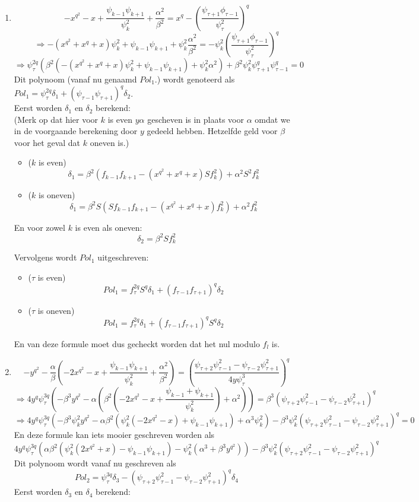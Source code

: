 \documentclass[10pt]{article}
\begin{document}
\begin{enumerate}
\item $$-x^{q^2}-x+\frac{\psi_{k-1}\psi_{k+1}}{\psi_k^2}+\frac{\alpha^2}{\beta^2}=x^q-(\frac{\psi_{\tau+1}\phi_{\tau-1}}{\psi_\tau^2})^q$$
$$ \Rightarrow -(x^{q^2}+x^q+x)\psi_k^2+\psi_{k-1}\psi_{k+1}+\psi_k^2\frac{\alpha^2}{\beta^2}=-\psi_k^2(\frac{\psi_{\tau+1}\phi_{\tau-1}}{\psi_\tau^2})^q$$
$$ \Rightarrow \psi_\tau^{2q}(\beta^2(-(x^{q^2}+x^q+x)\psi_k^2+\psi_{k-1}\psi_{k+1})+\psi_k^2\alpha^2)+\beta^2\psi_k^2\psi_{\tau+1}^q\psi_{\tau-1}^q=0  $$
Dit polynoom (vanaf nu genaamd $Pol_1$.) wordt genoteerd als $Pol_1=\psi_\tau^{2q}\delta_1+(\psi_{\tau-1}\psi_{\tau+1})^q \delta_2$.\\

Eerst worden $\delta_1$ en $\delta_2$ berekend:\\
(Merk op dat hier voor $k$ is even $y\alpha$ gescheven is in plaats voor $\alpha$ omdat we in de voorgaande berekening door $y$ gedeeld hebben. Hetzelfde geld voor $\beta$ voor het geval dat $k$ oneven is.)
\begin{itemize}
\item ($k$ is even) $$\delta_1=\beta^2(f_{k-1}f_{k+1}-(x^{q^2}+x^q+x)Sf_k^2)+\alpha^2S^2f_k^2$$
\item ($k$ is oneven) $$\delta_1=\beta^2S(Sf_{k-1}f_{k+1}-(x^{q^2}+x^q+x)f_k^2)+\alpha^2f_k^2$$
\end{itemize}
En voor zowel $k$ is even als oneven:$$\delta_2=\beta^2Sf_k^2$$

Vervolgens wordt $Pol_1$ uitgeschreven:
\begin{itemize}
\item ($\tau$ is even) $$Pol_1=f_\tau^{2q}S^q\delta_1+(f_{\tau-1}f_{\tau+1})^q\delta_2$$
\item ($\tau$ is oneven) $$Pol_1=f_\tau^{2q}\delta_1+(f_{\tau-1}f_{\tau+1})^qS^q\delta_2$$
\end{itemize}

En van deze formule moet dus gecheckt worden dat het nul modulo $f_l$ is.
\item $$-y^{q^2}-\frac{\alpha}{\beta}(-2x^{q^2}-x+\frac{\psi_{k-1}\psi_{k+1}}{\psi_k^2}+\frac{\alpha^2}{\beta^2})=(\frac{\psi_{\tau+2}\psi_{\tau-1}^2-\psi_{\tau-2}\psi_{\tau+1}^2}{4y\psi_\tau^3})^q$$
$$\Rightarrow 4y^q\psi_\tau^{3q}(-\beta^3y^{q^2}-\alpha(\beta^2(-2x^{q^2}-x+\frac{\psi_{k-1}+\psi_{k+1}}{\psi_k^2})+\alpha^2))=\beta^3(\psi_{\tau+2}\psi_{\tau-1}^2-\psi_{\tau-2}\psi_{\tau+1}^2)^q$$
$$\Rightarrow 4y^q\psi_\tau^{3q}(-\beta^3\psi_k^2y^{q^2}-\alpha\beta^2(\psi_k^2(-2x^{q^2}-x)+\psi_{k-1}\psi_{k+1})+\alpha^3\psi_k^2)-\beta^3\psi_k^2(\psi_{\tau+2}\psi_{\tau-1}^2-\psi_{\tau-2}\psi_{\tau+1}^2)^q=0$$
En deze formule kan iets mooier geschreven worden als
$$ 4y^q\psi_\tau^{3q}(\alpha\beta^2(\psi_k^2(2x^{q^2}+x)-\psi_{k-1}\psi_{k+1})-\psi_k^2(\alpha^3+\beta^3y^{q^2}))-\beta^3\psi_k^2(\psi_{\tau+2}\psi_{\tau-1}^2-\psi_{\tau-2}\psi_{\tau+1}^2)^q $$
Dit polynoom wordt vanaf nu geschreven als $$Pol_2=\psi_\tau^{3q}\delta_3-(\psi_{\tau+2}\psi_{\tau-1}^2-\psi_{\tau-2}\psi_{\tau+1}^2)^q\delta_4$$
Eerst worden $\delta_3$ en $\delta_4$ berekend:


\end{enumerate}
\end{document}
